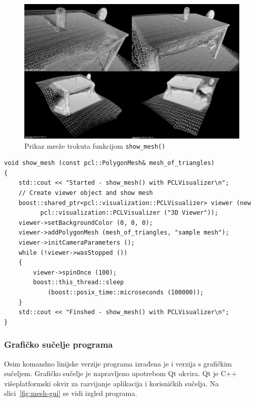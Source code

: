 \begin{figure}[H]
\centering
\includegraphics[scale=0.24]{figures/tablescene-mesh-perspectives.png}
\caption{Prikaz mreže trokuta funkcijom \texttt{show\_mesh()} }
\label{fig:tablesecne-mesh-perspectives}
\end{figure}

\begin{lstlisting}[label=lstPrikaz,caption={Izvorni kod funkcije
\texttt{show\_mesh()} }]
void show_mesh (const pcl::PolygonMesh& mesh_of_triangles)
{
    std::cout << "Started - show_mesh() with PCLVisualizer\n";
    // Create viewer object and show mesh
    boost::shared_ptr<pcl::visualization::PCLVisualizer> viewer (new
          pcl::visualization::PCLVisualizer ("3D Viewer"));
    viewer->setBackgroundColor (0, 0, 0);
    viewer->addPolygonMesh (mesh_of_triangles, "sample mesh");
    viewer->initCameraParameters (); 
    while (!viewer->wasStopped ())
    {
        viewer->spinOnce (100); 
        boost::this_thread::sleep 
            (boost::posix_time::microseconds (100000));
    }
    std::cout << "Finshed - show_mesh() with PCLVisualizer\n";
}
\end{lstlisting}




\newpage
\subsubsection{Grafičko sučelje programa} %
\label{ssub:Grafičko sučelje programa}

Osim komandno linijske verzije programa izrađena je i verzija s
grafičkim sučeljem. Grafičko sučelje je napravljeno upotrebom Qt okvira.
Qt je C++ višeplatformski okvir za razvijanje aplikacija i korisničkih
sučelja. Na slici~\ref{fig:mesh-gui} se vidi izgled programa.


